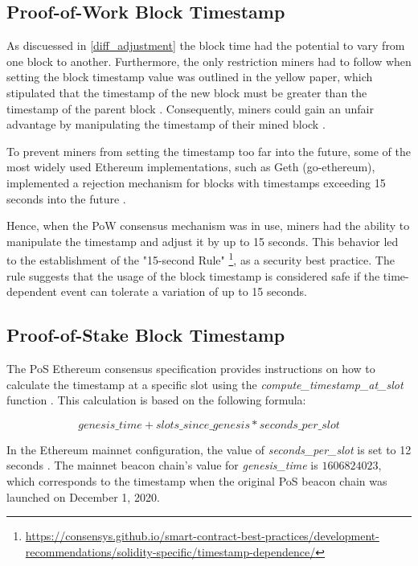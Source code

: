 \subsection{Proof-of-Work Block Timestamp}
As discuessed in \ref{diff_adjustment} the block time had the
potential to vary from one block to another. Furthermore, the only restriction
miners had to follow when setting the block timestamp value was outlined in the
yellow paper, which stipulated that the timestamp of the new block must be
greater than the timestamp of the parent block \cite{ethyellowpaper2023}.
Consequently, miners could gain an unfair advantage by manipulating the
timestamp of their mined block \cite{swc116}.


To prevent miners from setting the timestamp too far into the future, some of the most widely used Ethereum implementations, such as Geth (go-ethereum), implemented a rejection mechanism for blocks with timestamps exceeding 15 seconds into the future \cite{go-ethereum-15-sek-limit}.

Hence, when the PoW consensus mechanism was in use, miners had the ability to
manipulate the timestamp and adjust it by up to 15 seconds. This behavior led
to the establishment of the "15-second Rule"
\footnote{\url{https://consensys.github.io/smart-contract-best-practices/development-recommendations/solidity-specific/timestamp-dependence/}},
as a security best practice. The
rule suggests that the usage of the block timestamp is considered
safe if the time-dependent event can tolerate a variation of up to 15 seconds. 

\subsection{Proof-of-Stake Block Timestamp}

The PoS Ethereum consensus specification provides instructions on how to
calculate the timestamp at a specific slot using the
\textit{compute\_timestamp\_at\_slot} function \cite{compute-timestamp-at-slot}.
This calculation is based on the following formula:

\begin{equation}
genesis\_time + slots\_since\_genesis *
seconds\_per\_slot
\end{equation}


In the Ethereum mainnet configuration, the value of \textit{seconds\_per\_slot} is set to
12 seconds \cite{seconds-per-slot-mainnet} \cite{seconds-per-slot-mainnet-doc}.
The mainnet beacon chain's value for \textit{genesis\_time} is $1606824023$, which
corresponds to the timestamp when the original PoS beacon chain was launched on
December 1, 2020.

